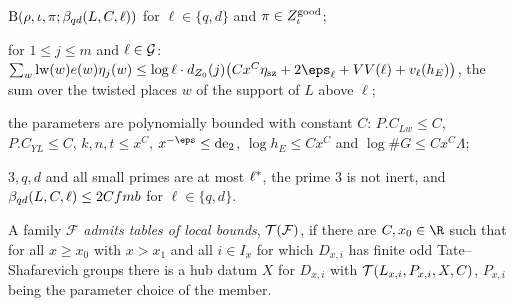 \begin{definition}
\begin{description}[style=nextline,leftmargin=1.5em,font=\normalfont\itshape]
\item[ram] $\mathrm{B}(\rho,\iota,\pi;\beta_{qd}(L,C,\ell))$ for $\ell\in\{q,d\}$ and $\pi\in Z^{\mathrm{good}}_\iota$;
\item[typ] for $1\le j\le m$ and $\ell\in\mathcal G$:
$\sum_{w}\mathrm{lw}(w)e(w)\eta_j(w)\le\log\ell\cdot d_{Z_0}(j)\bigl(Cx^C\eta_{\mathrm{sz}}+2\eps_\ell+VV(\ell)+v_\ell(h_E)\bigr)$, the sum
over the twisted places $w$ of the support of $L$ above $\ell$;
\item[par] the parameters are polynomially bounded with constant $C$: $P.C_{Lw}\le C$, $P.C_{YL}\le C$, $k,n,t\le x^C$,
$x^{-\eps}\le\mathrm{de}_2$, $\log h_E\le Cx^C$ and $\log\#G\le Cx^C\Lambda$;
\item[small] $3,q,d$ and all small primes are at most $\ell^{*}$, the prime $3$ is not inert, and $\beta_{qd}(L,C,\ell)\le2Cfmb$
for $\ell\in\{q,d\}$.
\end{description}
A family $\mathcal F$ \emph{admits tables of local bounds}, $\mathcal T(\mathcal F)$, if there are $C,x_0\in\R$ such that for all
$x\ge x_0$ with $x>x_1$ and all $i\in I_x$ for which $D_{x,i}$ has finite odd Tate--Shafarevich groups there is a hub datum $X$ for
$D_{x,i}$ with $\mathcal T(L_{x,i},P_{x,i},X,C)$, $P_{x,i}$ being the parameter choice of the member.
\end{definition}

